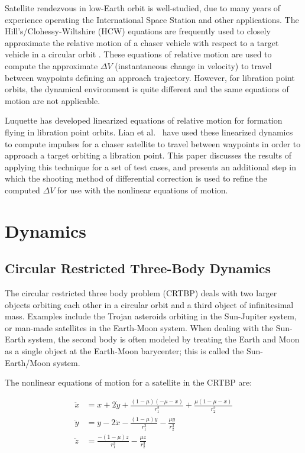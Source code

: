 \documentclass[a4paper]{article}
\begin{document}
Satellite rendezvous in low-Earth orbit is well-studied, due to many years of experience operating the International Space Station and other applications.  The Hill's/Clohessy-Wiltshire (HCW) equations are frequently used to closely approximate the relative motion of a chaser vehicle with respect to a target vehicle in a circular orbit \cite{clohessy1960}.  These equations of relative motion are used to compute the approximate \(\Delta V\) (instantaneous change in velocity) to travel between waypoints defining an approach trajectory.  However, for libration point orbits, the dynamical environment is quite different and the same equations of motion are not applicable.  %

Luquette \cite{luquette2004} has developed linearized equations of relative motion for formation flying in libration point orbits.  Lian et al.~\cite{lian2011} have used these linearized dynamics to compute impulses for a chaser satellite to travel between waypoints in order to approach a target orbiting a libration point.  This paper discusses the results of applying this technique for a set of test cases, and presents an additional step in which the shooting method of differential correction is used to refine the computed \(\Delta V\) for use with the nonlinear equations of motion.  %


\section{Dynamics}

\subsection{Circular Restricted Three-Body Dynamics}
The circular restricted three body problem (CRTBP) deals with two larger objects orbiting each other in a circular orbit and a third object of infinitesimal mass.  Examples include the Trojan asteroids orbiting in the Sun-Jupiter system, or man-made satellites in the Earth-Moon system.  When dealing with the Sun-Earth system, the second body is often modeled by treating the Earth and Moon as a single object at the Earth-Moon barycenter; this is called the Sun-Earth/Moon system.

The nonlinear equations of motion for a satellite in the CRTBP are:

\begin{equation} \label{eq:CRTBP}
\begin{aligned}
\ddot{x} &= x + 2\dot{y} + \frac{(1 - \mu)(-\mu - x)}{r_1^3} + \frac{\mu(1 - \mu - x)}{r_2^3} \\
\ddot{y} &= y - 2\dot{x} - \frac{(1 - \mu)y}{r_1^3} - \frac{\mu y}{r_2^3} \\
\ddot{z} &= \frac{-(1 - \mu)z}{r_1^3} - \frac{\mu z}{r_2^3}
\end{aligned}
\end{equation}
\end{document}
